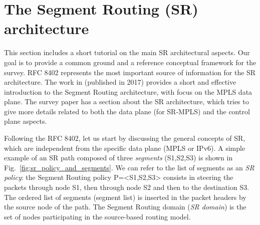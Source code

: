 \section{The Segment Routing (SR) architecture}
\label{sec:arch}

This section includes a short tutorial on the main SR architectural aspects. Our goal is to provide a common ground and a reference conceptual framework for the survey. RFC 8402 \cite{rfc8402} represents the most important source of information for the SR architecture. The work in \cite{sr-ietf-journal} (published in 2017) provides a short and effective introduction to the Segment Routing architecture, with focus on the MPLS data plane. The survey paper \cite{abdullah2018segment} has a section about the SR architecture, which tries to give more details related to both the data plane (for SR-MPLS) and the control plane aspects.  

Following the RFC 8402, let us start by discussing the general concepts of SR, which are independent from the specific data plane (MPLS or IPv6). A simple example of an SR path composed of three \textit{segments} (S1,S2,S3) is shown in Fig.~\ref{fig:sr_policy_and_segments}. We can refer to the list of segments as an \textit{SR policy}: the Segment Routing policy P=<S1,S2,S3> consists in steering the packets through node S1, then through node S2 and then to the destination S3. The ordered list of segments (segment list) is inserted in the packet headers by the source node of the path. The Segment Routing domain (\textit{SR domain}) is the set of nodes participating in the source-based routing model.

